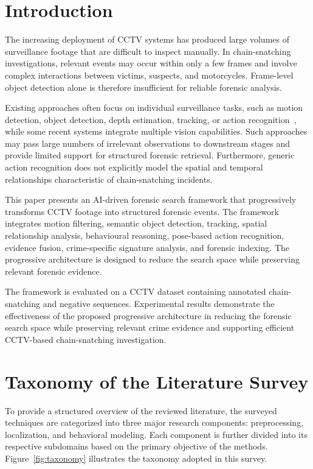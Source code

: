 \documentclass[conference]{IEEEtran}
\begin{document}
\section{Introduction}

The increasing deployment of CCTV systems has produced large volumes of
surveillance footage that are difficult to inspect manually. In
chain-snatching investigations, relevant events may occur within only a
few frames and involve complex interactions between victims, suspects,
and motorcycles. Frame-level object detection alone is therefore
insufficient for reliable forensic analysis.

Existing approaches often focus on individual surveillance tasks, such as
motion detection, object detection, depth estimation, tracking, or action
recognition~\cite{roy2018snatch}, while some recent systems integrate
multiple vision capabilities. Such approaches may pass large numbers of
irrelevant observations to downstream stages and provide limited
support for structured forensic retrieval. Furthermore, generic action
recognition does not explicitly model the spatial and temporal
relationships characteristic of chain-snatching incidents.

This paper presents an AI-driven forensic search framework that
progressively transforms CCTV footage into structured forensic events.
The framework integrates motion filtering, semantic object detection,
tracking, spatial relationship analysis, behavioural reasoning,
pose-based action recognition, evidence fusion, crime-specific
signature analysis, and forensic indexing. The progressive architecture
is designed to reduce the search space while preserving relevant
forensic evidence.

The framework is evaluated on a CCTV dataset containing annotated
chain-snatching and negative sequences. Experimental results demonstrate
the effectiveness of the proposed progressive architecture in reducing
the forensic search space while preserving relevant crime evidence and
supporting efficient CCTV-based chain-snatching investigation.

\section{Taxonomy of the Literature Survey}

To provide a structured overview of the reviewed literature, the surveyed techniques are categorized into three major research components: preprocessing, localization, and behavioral modeling. Each component is further divided into its respective subdomains based on the primary objective of the methods. Figure~\ref{fig:taxonomy} illustrates the taxonomy adopted in this survey.
\end{document}
